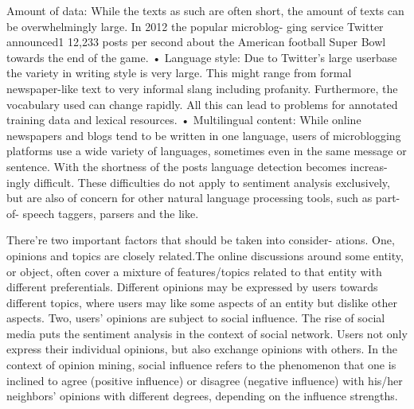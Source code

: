 \documentclass[twocolumn]{svjour3}          %
\begin{document}
Amount of data: While the texts as such are often short, the amount of texts can be overwhelmingly large. In 2012 the popular microblog-
ging service Twitter announced1 12,233 posts per second about the American football Super Bowl towards the end of the game.
• Language style: Due to Twitter’s large userbase the variety in writing style is very large. This might range from formal newspaper-like text to
very informal slang including profanity. Furthermore, the vocabulary used can change rapidly. All this can lead to problems for annotated training data and lexical resources.
• Multilingual content: While online newspapers and blogs tend to be written in one language, users of microblogging platforms use a wide variety of languages, sometimes even in the same message or sentence. With the shortness of the posts language detection becomes increas- ingly difficult.
These difficulties do not apply to sentiment analysis exclusively, but are also of concern for other natural language processing tools, such as part-of- speech taggers, parsers and the like.



There’re two important factors that should be taken into consider- ations. One, opinions and topics are closely related.The online discussions around some entity, or object, often cover a mixture of features/topics related to that entity with different preferentials. Different opinions may be expressed by users towards different topics, where users may like some aspects of an entity but dislike other aspects. Two, users’ opinions are subject to social influence. The rise of social media puts the sentiment analysis in the context of social network. Users not only express their individual opinions, but also exchange opinions with others. In the context of opinion mining, social influence refers to the phenomenon that one is inclined to agree (positive influence) or disagree (negative influence) with his/her neighbors’ opinions with different degrees, depending on the influence strengths.\cite{li2012mining}
\end{document}
